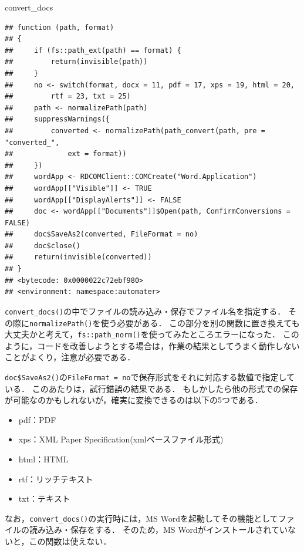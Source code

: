 \documentclass[
]{article}
\newenvironment{Shaded}{\begin{snugshade}}{\end{snugshade}}
\newcommand{\NormalTok}[1]{#1}
\providecommand{\tightlist}{%
  \setlength{\itemsep}{0pt}\setlength{\parskip}{0pt}}
\begin{document}
\begin{Shaded}
\begin{Highlighting}[]
\NormalTok{convert\_docs}
\end{Highlighting}
\end{Shaded}

\begin{verbatim}
## function (path, format) 
## {
##     if (fs::path_ext(path) == format) {
##         return(invisible(path))
##     }
##     no <- switch(format, docx = 11, pdf = 17, xps = 19, html = 20, 
##         rtf = 23, txt = 25)
##     path <- normalizePath(path)
##     suppressWarnings({
##         converted <- normalizePath(path_convert(path, pre = "converted_", 
##             ext = format))
##     })
##     wordApp <- RDCOMClient::COMCreate("Word.Application")
##     wordApp[["Visible"]] <- TRUE
##     wordApp[["DisplayAlerts"]] <- FALSE
##     doc <- wordApp[["Documents"]]$Open(path, ConfirmConversions = FALSE)
##     doc$SaveAs2(converted, FileFormat = no)
##     doc$close()
##     return(invisible(converted))
## }
## <bytecode: 0x0000022c72ebf980>
## <environment: namespace:automater>
\end{verbatim}

\texttt{convert\_docs()}の中でファイルの読み込み・保存でファイル名を指定する．
その際に\texttt{normalizePath()}を使う必要がある．
この部分を別の関数に置き換えても大丈夫かと考えて，\texttt{fs::path\_norm()}を使ってみたところエラーになった．
このように，コードを改善しようとする場合は，作業の結果としてうまく動作しないことがよくり，注意が必要である．

\texttt{doc\$SaveAs2()}の\texttt{FileFormat\ =\ no}で保存形式をそれに対応する数値で指定している．
このあたりは，試行錯誤の結果である．
もしかしたら他の形式での保存が可能なのかもしれないが，確実に変換できるのは以下の5つである．

\begin{itemize}
\tightlist
\item
  pdf：PDF
\item
  xps：XML Paper Specification(xmlベースファイル形式)\\
\item
  html：HTML\\
\item
  rtf：リッチテキスト\\
\item
  txt：テキスト
\end{itemize}

なお，\texttt{convert\_docs()}の実行時には，MS Wordを起動してその機能としてファイルの読み込み・保存をする．
そのため，MS Wordがインストールされていないと，この関数は使えない．
\end{document}
